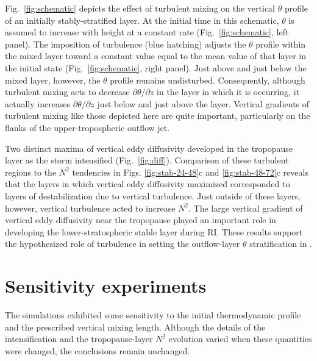 Fig.~\ref{fig:schematic} depicts the effect of turbulent mixing on the vertical $\theta$ profile of an initially stably-stratified layer.
At the initial time in this schematic, $\theta$ is assumed to increase with height at a constant rate (Fig.~\ref{fig:schematic}, left panel).
The imposition of turbulence (blue hatching) adjusts the $\theta$ profile within the mixed layer toward a constant value equal to the mean value of that layer in the initial state (Fig.~\ref{fig:schematic}, right panel).
Just above and just below the mixed layer, however, the $\theta$ profile remains undisturbed.
Consequently, although turbulent mixing acts to decrease $\partial \theta/\partial z$ in the layer in which it is occurring, it actually increases $\partial \theta/\partial z$ just below and just above the layer.
Vertical gradients of turbulent mixing like those depicted here are quite important, particularly on the flanks of the upper-tropospheric outflow jet.

Two distinct maxima of vertical eddy diffusivity developed in the tropopause layer as the storm intensified (Fig.~\ref{fig:diff}).
Comparison of these turbulent regions to the $N^2$ tendencies in Figs. \ref{fig:stab-24-48}c and \ref{fig:stab-48-72}c reveals that the layers in which vertical eddy diffusivity maximized corresponded to layers of destabilization due to vertical turbulence.
Just outside of these layers, however, vertical turbulence acted to increase $N^2$.
The large vertical gradient of vertical eddy diffusivity near the tropopause played an important role in developing the lower-stratospheric stable layer during RI.
These results support the hypothesized role of turbulence in setting the outflow-layer $\theta$ stratification in \cite{RotunnoEmanuel}.

  \section{Sensitivity experiments}
The simulations exhibited some sensitivity to the initial thermodynamic profile and the prescribed vertical mixing length.
Although the details of the intensification and the tropopause-layer $N^2$ evolution varied when these quantities were changed, the conclusions remain unchanged.

